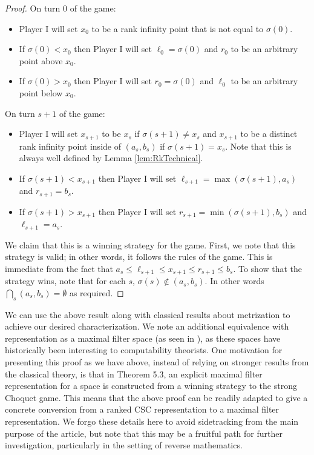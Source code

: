 \documentclass[11pt]{amsart}
\theoremstyle{remark}
\begin{document}
\begin{proof}
On turn $0$ of the game:
\begin{itemize}
	\item Player I will set $x_0$ to be a rank infinity point that is not equal to $\sigma(0)$.
	\item If $\sigma(0)<x_0$ then Player I will set $\ell_0=\sigma(0)$ and $r_0$ to be an arbitrary point above $x_0$.
	\item If $\sigma(0)>x_0$ then Player I will set $r_0=\sigma(0)$ and $\ell_0$ to be an arbitrary point below $x_0$.
\end{itemize}

On turn $s+1$ of the game: 
\begin{itemize}
	\item Player I will set $x_{s+1}$ to be $x_s$ if  $\sigma(s+1)\neq x_s$ and $x_{s+1}$ to be a distinct rank infinity point inside of $(a_s,b_s)$ if $\sigma(s+1) = x_s$. Note that this is always well defined by Lemma \ref{lem:RkTechnical}.
	\item If $\sigma(s+1)<x_{s+1}$ then Player I will set $\ell_{s+1}=\max(\sigma(s+1),a_s)$ and $r_{s+1}=b_s$.
	\item If $\sigma(s+1)>x_{s+1}$ then Player I will set $r_{s+1}=\min(\sigma(s+1),b_s)$ and $\ell_{s+1}=a_s$. 
\end{itemize}

We claim that this is a winning strategy for the game.
First, we note that this strategy is valid; in other words, it follows the rules of the game.
This is immediate from the fact that $a_s\leq \ell_{s+1} \leq x_{s+1} \leq r_{s+1} \leq b_s$. 
To show that the strategy wins, note that for each $s$, $\sigma(s)\not\in (a_s,b_s)$.
In other words $\bigcap_s (a_s,b_s) = \emptyset$ as required.
\end{proof}


We can use the above result along with classical results about metrization \cite{C69} to achieve our desired characterization.
We note an additional equivalence with representation as a maximal filter space (as seen in \cite{MS09,MS10}), as these spaces have historically been interesting to computability theorists.
One motivation for presenting this proof as we have above, instead of relying on stronger results from the classical theory, is that in \cite{MS10} Theorem 5.3, an explicit maximal filter representation for a space is constructed from a winning strategy to the strong Choquet game.
This means that the above proof can be readily adapted to give a concrete conversion from a ranked CSC representation to a maximal filter representation.
We forgo these details here to avoid sidetracking from the main purpose of the article, but note that this may be a fruitful path for further investigation, particularly in the setting of reverse mathematics.
\end{document}
